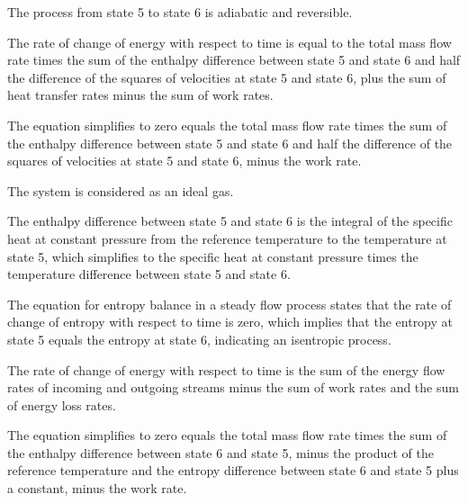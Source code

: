 The process from state 5 to state 6 is adiabatic and reversible.

The rate of change of energy with respect to time is equal to the total mass flow rate times the sum of the enthalpy difference between state 5 and state 6 and half the difference of the squares of velocities at state 5 and state 6, plus the sum of heat transfer rates minus the sum of work rates.

The equation simplifies to zero equals the total mass flow rate times the sum of the enthalpy difference between state 5 and state 6 and half the difference of the squares of velocities at state 5 and state 6, minus the work rate.

The system is considered as an ideal gas.

The enthalpy difference between state 5 and state 6 is the integral of the specific heat at constant pressure from the reference temperature to the temperature at state 5, which simplifies to the specific heat at constant pressure times the temperature difference between state 5 and state 6.

The equation for entropy balance in a steady flow process states that the rate of change of entropy with respect to time is zero, which implies that the entropy at state 5 equals the entropy at state 6, indicating an isentropic process.

The rate of change of energy with respect to time is the sum of the energy flow rates of incoming and outgoing streams minus the sum of work rates and the sum of energy loss rates.

The equation simplifies to zero equals the total mass flow rate times the sum of the enthalpy difference between state 6 and state 5, minus the product of the reference temperature and the entropy difference between state 6 and state 5 plus a constant, minus the work rate.